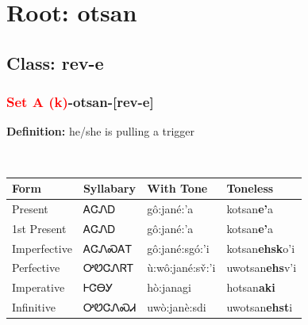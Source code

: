 \needspace{4in}
\section*{Root: otsan}
\nopagebreak
{}
\needspace{3in}
\subsection*{Class: rev-e}
\nopagebreak
\needspace{2in}
\subsubsection*{\textcolor{Red}{Set A (k)}{-}\textbf{otsan}{-}[rev-e]}
\nopagebreak
\textbf{Definition: } he/she is pulling a trigger
\\[0.5em]
\begin{tabularx}{\textwidth}{l X X X}%
\toprule%
\textbf{Form}&\textbf{Syllabary}&\textbf{With Tone}&\textbf{Toneless}\\%
\midrule%
Present&ᎪᏣᏁᎠ&gô:jané:’a&kotsan\textbf{e'}a\\%
1st Present&ᎪᏣᏁᎠ&gô:jané:’a&kotsan\textbf{e'}a\\%
Imperfective&ᎪᏣᏁᏍᎪᎢ&gô:jané:sgó:’i&kotsan\textbf{ehsk}o'i\\%
Perfective&ᎤᏬᏣᏁᏒᎢ&ù:wô:jané:sv̌:’i&uwotsan\textbf{ehs}v'i\\%
Imperative&ᎰᏣᎾᎩ&hò:janagi&hotsan\textbf{aki}\\%
Infinitive&ᎤᏬᏣᏁᏍᏗ&uwò:janè:sdi&uwotsan\textbf{ehst}i\\%
\bottomrule%
\end{tabularx}
\\[1em]